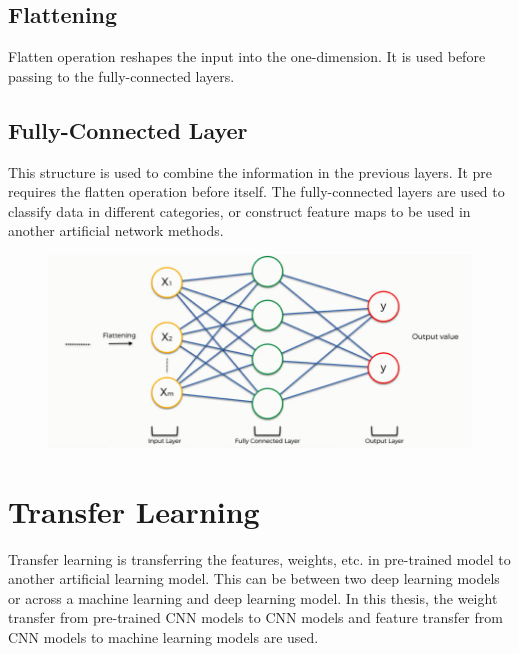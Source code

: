 \subsection{Flattening}

Flatten operation reshapes the input into the one-dimension. It is used before passing to the fully-connected layers.

\subsection{Fully-Connected Layer}

This structure is used to combine the information in the previous layers. It pre requires the flatten operation before itself. The fully-connected layers are used to classify data in different categories, or construct feature maps to be used in another artificial network methods.

\begin{figure}[h]
    \centering
    \includegraphics[width=\linewidth]{fig/fully_connected_layer.png}
	\vspace*{1mm}
    \label{fig:fully_connected_layer}
\end{figure}

\section{Transfer Learning}

Transfer learning is transferring the features, weights, etc. in pre-trained model to another artificial learning model. This can be between two deep learning models or across a machine learning and deep learning model. In this thesis, the weight transfer from pre-trained CNN models to CNN models and feature transfer from CNN models to machine learning models are used.

